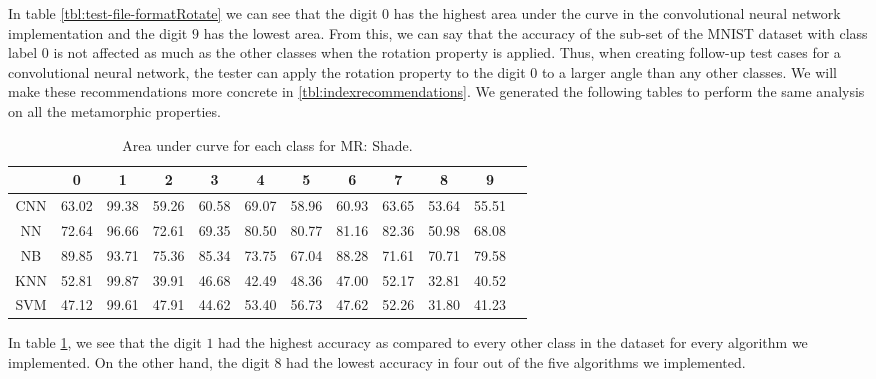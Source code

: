      In table \ref{tbl:test-file-formatRotate} we can see that the digit $0$ has the highest area under the curve in the convolutional neural network implementation and the digit $9$ has the lowest area. From this, we can say that the accuracy of the sub-set of the MNIST dataset with class label $0$ is not affected as much as the other classes when the rotation property is applied. Thus, when creating follow-up test cases for a convolutional neural network, the tester can apply the rotation property to the digit $0$ to a larger angle than any other classes. We will make these recommendations more concrete in \ref{tbl:indexrecommendations}.
     We generated the following tables to perform the same analysis on all the metamorphic properties.
    
    \begin{table}[H]
    \centering
    \begin{tabular}{|c|c|c|c|c|c|c|c|c|c|c|c|}
    \hline
     & 0 & 1 & 2 & 3 & 4 & 5 & 6 & 7 & 8 & 9 \\
    \hline
    CNN & 63.02 & \cellcolor{green!25}99.38 & 59.26 & 60.58 & 69.07 & 58.96 & 60.93 & 63.65 & \cellcolor{red!25}53.64 & 55.51 \\ 
    \hline
    NN & 72.64 & \cellcolor{green!25}96.66 & 72.61 & 69.35 & 80.50 & 80.77 & 81.16 & 82.36 & \cellcolor{red!25}50.98 & 68.08 \\
    \hline
    NB & 89.85 & \cellcolor{green!25}93.71 & 75.36 & 85.34 & 73.75 & \cellcolor{red!25}67.04 & 88.28 & 71.61 & 70.71 & 79.58 \\
    \hline
    KNN & 52.81 & \cellcolor{green!25}99.87 & 39.91 & 46.68 & 42.49 & 48.36 & 47.00 & 52.17 & \cellcolor{red!25}32.81 & 40.52 \\
    \hline
    SVM & 47.12 & \cellcolor{green!25}99.61 & 47.91 & 44.62 & 53.40 & 56.73 & 47.62 & 52.26 & \cellcolor{red!25}31.80 & 41.23 \\
    \hline
    \end{tabular}
    \caption{Area under curve for each class for MR: Shade.}
    \label{tbl:test-file-formatShade}
    \end{table}
    In table \ref{tbl:test-file-formatShade}, we see that the digit $1$ had the highest accuracy as compared to every other class in the dataset for every algorithm we implemented. On the other hand, the digit $8$ had the lowest accuracy in four out of the five algorithms we implemented.
